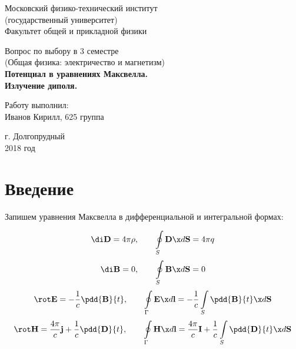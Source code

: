 \documentclass[12pt]{kiarticle}
\begin{document}
	
	\begin{titlepage}
	\begin{center}
		\large 	Московский физико-технический институт \\
		(государственный университет) \\
		Факультет общей и прикладной физики \\
		\vspace{0.2cm}
		
		\vspace{4.5cm}
		Вопрос по выбору в 3 семестре \\ \vspace{0.2cm}
		\large (Общая физика: электричество и магнетизм) \\ \vspace{0.2cm}
		\LARGE \textbf{Потенциал в уравнениях Максвелла. \\
			 Излучение диполя.}
	\end{center}
	\vspace{2.3cm} \large
	
	\begin{center}
		Работу выполнил: \\
		Иванов Кирилл,
		625 группа
		\vspace{10mm}		
		
	\end{center}
	
	\begin{center} \vspace{60mm}
		г. Долгопрудный \\
		2018 год
	\end{center}
\end{titlepage}



\section{Введение}

Запишем уравнения Максвелла в дифференциальной и интегральной формах: 


\begin{equation}\label{Gauss_E}
\di \mathbf{D} = 4\pi\rho, \qquad
\oint\limits_S  \mathbf{D} \x d\mathbf{S} = 4\pi q
\end{equation}
\begin{equation}\label{Gauss_B}
\di \textbf{B} = 0 , \qquad
\oint\limits_S  \mathbf{B} \x d\mathbf{S} =  0
\end{equation}
\begin{equation}\label{Faradey}
\rot \mathbf{E} = -\dfrac{1}{c}\pdd{\mathbf{B}}{t}, \qquad \oint\limits_\Gamma \mathbf{E} \x d\mathbf{l} = - \dfrac{1}{c} \int\limits_S  \pdd{\mathbf{B}}{t} \x d\mathbf{S}
\end{equation}
\begin{equation}\label{Circ_H}
\rot \mathbf{H} = \dfrac{4\pi}{c}\mathbf{j} + \dfrac{1}{c}\pdd{\mathbf{D}}{t}, \qquad
\oint\limits_\Gamma \mathbf{H} \x d\mathbf{l} = \dfrac{4\pi}{c}\mathbf{I} + \dfrac{1}{c} \int\limits_S  \pdd{\mathbf{D}}{t} \x d\mathbf{S} 
\end{equation}
\end{document}
